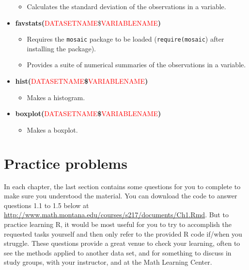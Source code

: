 \documentclass[]{book}
\providecommand{\tightlist}{%
  \setlength{\itemsep}{0pt}\setlength{\parskip}{0pt}}
\begin{document}
\begin{itemize}
  \begin{itemize}
  \tightlist
  \item
    Calculates the standard deviation of the observations in a variable.
  \end{itemize}
\item
  \textbf{favstats(}\textcolor{red}{DATASETNAME}\$\textcolor{red}{VARIABLENAME}\textbf{)}

  \begin{itemize}
  \item
    Requires the \texttt{mosaic} package to be loaded (\texttt{require(mosaic}) after
    installing the package).
  \item
    Provides a suite of numerical summaries of the observations in a variable.
  \end{itemize}
\item
  \textbf{hist(}\textcolor{red}{DATASETNAME}\textbf{\$}\textcolor{red}{VARIABLENAME}\textbf{)}

  \begin{itemize}
  \tightlist
  \item
    Makes a histogram. 
  \end{itemize}
\item
  \textbf{boxplot(}\textcolor{red}{DATASETNAME}\textbf{\$}\textcolor{red}{VARIABLENAME}\textbf{)}

  \begin{itemize}
  \tightlist
  \item
    Makes a boxplot. 
  \end{itemize}
\end{itemize}

\hypertarget{section1-6}{%
\section{Practice problems}\label{section1-6}}

In each chapter, the last section contains some questions for you to complete
to make sure you understood the
material. You can download the code to answer questions 1.1 to 1.5 below at
\url{http://www.math.montana.edu/courses/s217/documents/Ch1.Rmd}. But to practice
learning R, it would be most useful for you to try to accomplish the requested tasks
yourself and then only refer to the provided R code if/when you struggle.
These questions provide a great venue to check your learning, often to see the
methods applied to another data set, and for something to discuss in study groups,
with your instructor, and at the Math Learning Center.
\end{document}
